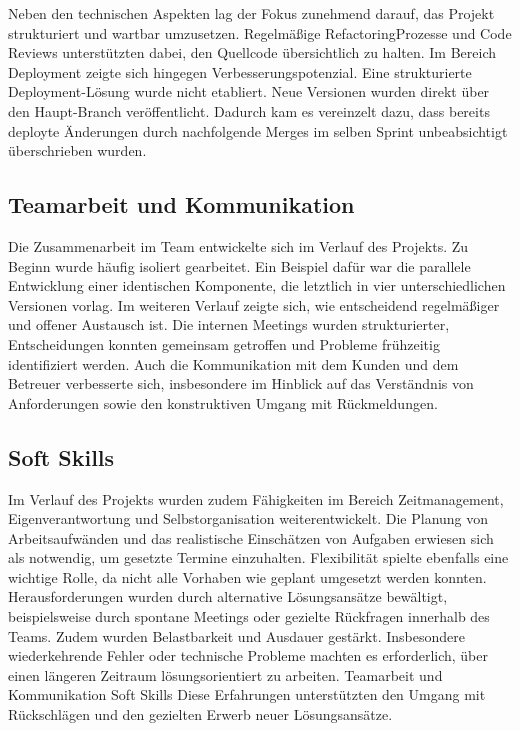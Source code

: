\documentclass[a4paper,12pt]{article}
\begin{document}
Neben den technischen Aspekten lag der Fokus zunehmend darauf, das Projekt strukturiert und wartbar umzusetzen. Regelmäßige RefactoringProzesse und Code Reviews unterstützten dabei, den Quellcode übersichtlich zu halten. Im Bereich Deployment zeigte sich hingegen Verbesserungspotenzial. Eine strukturierte Deployment-Lösung wurde nicht etabliert. Neue Versionen wurden direkt über den Haupt-Branch veröffentlicht. Dadurch kam es vereinzelt dazu, dass bereits deployte Änderungen durch nachfolgende Merges im selben Sprint unbeabsichtigt überschrieben wurden.

\newpage


\subsection{Teamarbeit und Kommunikation}

Die Zusammenarbeit im Team entwickelte sich im Verlauf des Projekts. Zu Beginn wurde häufig isoliert gearbeitet. Ein Beispiel dafür war die parallele Entwicklung einer identischen Komponente, die letztlich in vier unterschiedlichen Versionen vorlag. Im weiteren Verlauf zeigte sich, wie entscheidend regelmäßiger und offener Austausch ist. Die internen Meetings wurden strukturierter, Entscheidungen konnten gemeinsam getroffen und Probleme frühzeitig identifiziert werden. Auch die Kommunikation mit dem Kunden und dem Betreuer verbesserte sich, insbesondere im Hinblick auf das Verständnis von Anforderungen sowie den konstruktiven Umgang mit Rückmeldungen.


\subsection{Soft Skills}

Im Verlauf des Projekts wurden zudem Fähigkeiten im Bereich Zeitmanagement, Eigenverantwortung und Selbstorganisation weiterentwickelt. Die Planung von Arbeitsaufwänden und das realistische Einschätzen von Aufgaben erwiesen sich als notwendig, um gesetzte Termine einzuhalten. Flexibilität spielte ebenfalls eine wichtige Rolle, da nicht alle Vorhaben wie geplant umgesetzt werden konnten. Herausforderungen wurden durch alternative Lösungsansätze bewältigt, beispielsweise durch spontane Meetings oder gezielte Rückfragen innerhalb des Teams. Zudem wurden Belastbarkeit und Ausdauer gestärkt. Insbesondere wiederkehrende Fehler oder technische Probleme machten es erforderlich, über einen längeren Zeitraum lösungsorientiert zu arbeiten. Teamarbeit und Kommunikation Soft Skills Diese Erfahrungen unterstützten den Umgang mit Rückschlägen und den gezielten Erwerb neuer Lösungsansätze.
\end{document}
